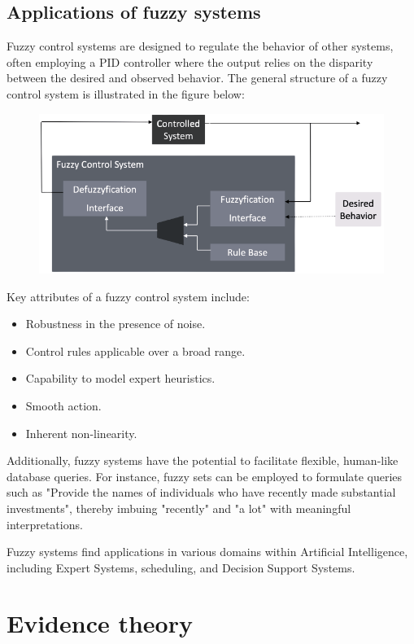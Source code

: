 \documentclass[12pt, a4paper]{report}
\begin{document}
    \section{Applications of fuzzy systems}
    Fuzzy control systems are designed to regulate the behavior of other systems, often employing a PID controller where the output relies on the disparity between the desired and observed behavior. 
    The general structure of a fuzzy control system is illustrated in the figure below:
    \begin{figure}[H]
        \centering
        \includegraphics[width=0.5\linewidth]{images/control.png}
    \end{figure}
    Key attributes of a fuzzy control system include:
    \begin{itemize}
        \item Robustness in the presence of noise.
        \item Control rules applicable over a broad range.
        \item Capability to model expert heuristics.
        \item Smooth action.
        \item Inherent non-linearity.
    \end{itemize}
    Additionally, fuzzy systems have the potential to facilitate flexible, human-like database queries. 
    For instance, fuzzy sets can be employed to formulate queries such as "Provide the names of individuals who have recently made substantial investments", thereby imbuing "recently" and "a lot" with meaningful interpretations.

    Fuzzy systems find applications in various domains within Artificial Intelligence, including Expert Systems, scheduling, and Decision Support Systems.

    \newpage

    \chapter{Evidence theory}
\end{document}
